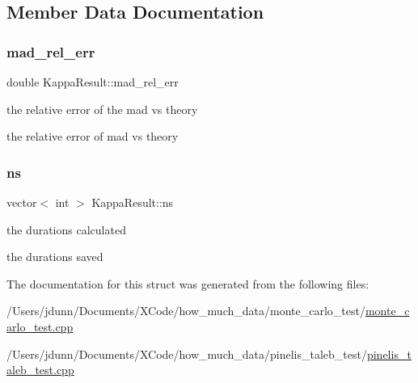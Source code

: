 \subsection{Member Data Documentation}
\mbox{\label{structKappaResult_a9fb1e6cd969e50ab18dae7fbf598f949}} 
\subsubsection{\texorpdfstring{mad\+\_\+rel\+\_\+err}{mad\_rel\_err}}
{\footnotesize\ttfamily double Kappa\+Result\+::mad\+\_\+rel\+\_\+err}



the relative error of the mad vs theory 

the relative error of mad vs theory \mbox{\label{structKappaResult_a48d379e6c356ee537839917a67a21c86}} 
\subsubsection{\texorpdfstring{ns}{ns}}
{\footnotesize\ttfamily vector$<$ int $>$ Kappa\+Result\+::ns}



the durations calculated 

the durations saved 

The documentation for this struct was generated from the following files\+:\begin{DoxyCompactItemize}
\item 
/\+Users/jdunn/\+Documents/\+X\+Code/how\+\_\+much\+\_\+data/monte\+\_\+carlo\+\_\+test/\mbox{\hyperlink{monte__carlo__test_8cpp}{monte\+\_\+carlo\+\_\+test.\+cpp}}\item 
/\+Users/jdunn/\+Documents/\+X\+Code/how\+\_\+much\+\_\+data/pinelis\+\_\+taleb\+\_\+test/\mbox{\hyperlink{pinelis__taleb__test_8cpp}{pinelis\+\_\+taleb\+\_\+test.\+cpp}}\end{DoxyCompactItemize}
